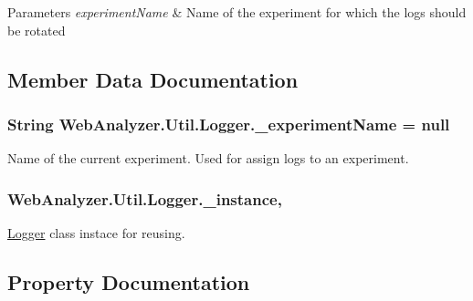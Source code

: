 \begin{DoxyParams}{Parameters}
{\em experiment\+Name} & Name of the experiment for which the logs should be rotated\\
\hline
\end{DoxyParams}


\subsection{Member Data Documentation}
\hypertarget{class_web_analyzer_1_1_util_1_1_logger_abf60192ad5104e885eb651bfd8f5eb78}{}
\subsubsection[{\+\_\+experiment\+Name}]{\setlength{\rightskip}{0pt plus 5cm}String Web\+Analyzer.\+Util.\+Logger.\+\_\+experiment\+Name = null\hspace{0.3cm}{\ttfamily [private]}}\label{class_web_analyzer_1_1_util_1_1_logger_abf60192ad5104e885eb651bfd8f5eb78}


Name of the current experiment. Used for assign logs to an experiment. 

\hypertarget{class_web_analyzer_1_1_util_1_1_logger_a8543413dc13f3636a0c3a717d75ed6b0}{}
\subsubsection[{\+\_\+instance}]{ Web\+Analyzer.\+Util.\+Logger.\+\_\+instance\hspace{0.3cm}{\ttfamily [static]}, {\ttfamily [private]}}\label{class_web_analyzer_1_1_util_1_1_logger_a8543413dc13f3636a0c3a717d75ed6b0}


\hyperlink{class_web_analyzer_1_1_util_1_1_logger}{Logger} class instace for reusing. 



\subsection{Property Documentation}
\hypertarget{class_web_analyzer_1_1_util_1_1_logger_ae0228bcd61648d9b38e8aceaaf97024a}{}
